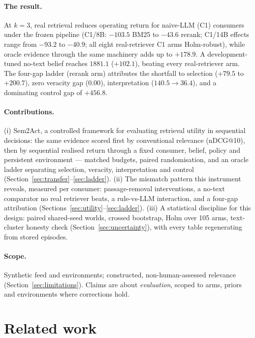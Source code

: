 \documentclass[a4paper,runningheads]{llncs}
\begin{document}
\paragraph{The result.}
At $k=3$, real retrieval reduces operating return for naive-LLM (C1)
consumers under the frozen pipeline (C1/8B: $-103.5$ BM25 to $-43.6$
rerank; C1/14B effects range from $-93.2$ to $-40.9$; all eight
real-retriever C1 arms
Holm-robust), while oracle evidence through
the same machinery adds up to $+178.9$. A development-tuned no-text
belief reaches $1881.1$ ($+102.1$),
beating every real-retriever arm. The four-gap ladder (rerank arm)
attributes the shortfall to selection ($+79.5$ to $+200.7$), zero veracity
gap ($0.00$), interpretation ($140.5 \to 36.4$), and a dominating control
gap of $+456.8$.

\paragraph{Contributions.}
(i) Sem2Act, a controlled framework for evaluating retrieval utility in
sequential decisions: the same evidence scored first by
conventional relevance (nDCG@10), then by sequential realised return
through a fixed consumer, belief, policy and persistent
environment --- matched budgets, paired randomisation, and an oracle
ladder separating selection, veracity, interpretation and control
(Section~\ref{sec:transfer}--\ref{sec:ladder}).
(ii) The mismatch pattern this instrument reveals, measured per
consumer: passage-removal interventions, a no-text comparator no real
retriever beats, a rule-vs-LLM interaction, and a four-gap
attribution (Sections~\ref{sec:utility}--\ref{sec:ladder}).
(iii) A statistical discipline for this design: paired shared-seed worlds,
crossed bootstrap, Holm over 105 arms, text-cluster honesty
check (Section~\ref{sec:uncertainty}), with every table regenerating from
stored episodes.

\paragraph{Scope.} Synthetic feed and environments; constructed,
non-human-assessed relevance (Section~\ref{sec:limitations}). Claims are
about \emph{evaluation}, scoped to arms, priors and environments where
corrections hold.

\section{Related work}
\label{sec:related}
\end{document}
